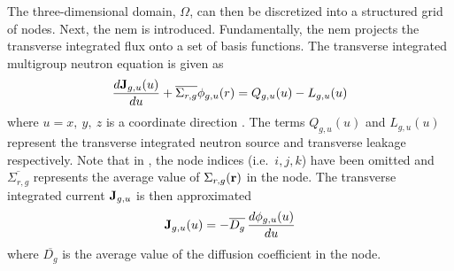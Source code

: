     The three-dimensional domain, $\Omega$, can then be discretized into a
    structured grid of nodes. Next, the \gls{nem} is introduced. Fundamentally,
    the \gls{nem} projects the transverse integrated flux onto a set of basis
    functions. The transverse integrated multigroup neutron equation is given as
    \begin{equation}
      \label{eq:transverse_multigroup_diffusion}
      \frac{d \mathbf{J}_{g,u} (u)}{d u} + \overline{\Sigma_{r,g}}
        \phi_{g,u}(r) = Q_{g,u}(u) - L_{g,u}(u)
    \end{equation}
    where $u = x,\ y,\ z$ is a coordinate direction \cite{qe2paper}. The terms 
    $Q_{g,u}(u)$ and $L_{g,u}(u)$ represent the transverse integrated neutron
    source and transverse leakage respectively. Note that in
    , the node indices
    (i.e.~$i,j,k$) have been omitted and $\overline{\Sigma_{r,g}}$ represents
    the average value of $\Sigma_{r,g}(\mathbf{r})$ in the node. The transverse
    integrated current $\mathbf{J}_{g,u}$ is then approximated
    \begin{equation}
      \label{eq:current_approximation}
      \mathbf{J}_{g,u}(u) = - \overline{D_g} \, \frac{d \phi_{g,u}(u)}{du}
    \end{equation}
    where $\overline{D_g}$ is the average value of the diffusion coefficient in
    the node.


